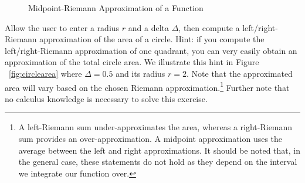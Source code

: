 \begin{figure}[H]
\begin{center}
\end{center}
\caption{Midpoint-Riemann Approximation of a Function}
\label{fig:riemannf}
\end{figure}

Allow the user to enter a radius $r$ and a delta $\Delta$, then compute a left/right-Riemann approximation of the area of a circle. Hint: if you compute the left/right-Riemann approximation of one quadrant, you can very easily obtain an approximation of the total circle area. We illustrate this hint in Figure ~\ref{fig:circlearea} where $\Delta=0.5$ and its radius $r=2$. Note that the approximated area will vary based on the chosen Riemann approximation.\footnote{A left-Riemann sum under-approximates the area, whereas a right-Riemann sum provides an over-approximation. A midpoint approximation uses the average between the left and right approximations. It should be noted that, in the general case, these statements do not hold as they depend on the interval we integrate our function over.} Further note that no calculus knowledge is necessary to solve this exercise.

